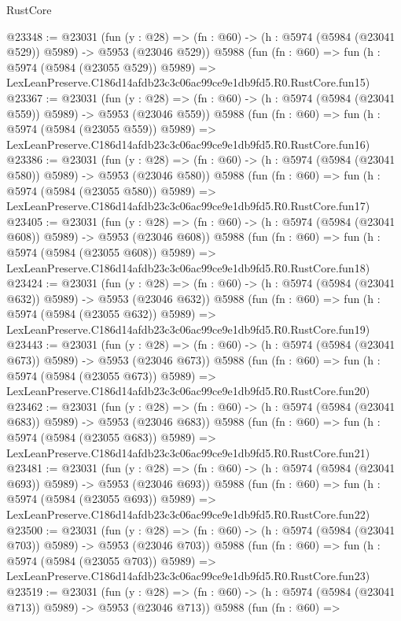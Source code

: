 \begin{lexlean}{RustCore}
\begin{coremodule}
@23348 := @23031
    (fun (y : @28) => (fn : @60) -> (h : @5974 (@5984 (@23041 @529)) @5989) -> @5953 (@23046 @529))
    @5988
    (fun (fn : @60) =>
    fun (h : @5974 (@5984 (@23055 @529)) @5989) =>
    LexLeanPreserve.C186d14afdb23c3c06ac99ce9e1db9fd5.R0.RustCore.fun15)
@23367 := @23031
    (fun (y : @28) => (fn : @60) -> (h : @5974 (@5984 (@23041 @559)) @5989) -> @5953 (@23046 @559))
    @5988
    (fun (fn : @60) =>
    fun (h : @5974 (@5984 (@23055 @559)) @5989) =>
    LexLeanPreserve.C186d14afdb23c3c06ac99ce9e1db9fd5.R0.RustCore.fun16)
@23386 := @23031
    (fun (y : @28) => (fn : @60) -> (h : @5974 (@5984 (@23041 @580)) @5989) -> @5953 (@23046 @580))
    @5988
    (fun (fn : @60) =>
    fun (h : @5974 (@5984 (@23055 @580)) @5989) =>
    LexLeanPreserve.C186d14afdb23c3c06ac99ce9e1db9fd5.R0.RustCore.fun17)
@23405 := @23031
    (fun (y : @28) => (fn : @60) -> (h : @5974 (@5984 (@23041 @608)) @5989) -> @5953 (@23046 @608))
    @5988
    (fun (fn : @60) =>
    fun (h : @5974 (@5984 (@23055 @608)) @5989) =>
    LexLeanPreserve.C186d14afdb23c3c06ac99ce9e1db9fd5.R0.RustCore.fun18)
@23424 := @23031
    (fun (y : @28) => (fn : @60) -> (h : @5974 (@5984 (@23041 @632)) @5989) -> @5953 (@23046 @632))
    @5988
    (fun (fn : @60) =>
    fun (h : @5974 (@5984 (@23055 @632)) @5989) =>
    LexLeanPreserve.C186d14afdb23c3c06ac99ce9e1db9fd5.R0.RustCore.fun19)
@23443 := @23031
    (fun (y : @28) => (fn : @60) -> (h : @5974 (@5984 (@23041 @673)) @5989) -> @5953 (@23046 @673))
    @5988
    (fun (fn : @60) =>
    fun (h : @5974 (@5984 (@23055 @673)) @5989) =>
    LexLeanPreserve.C186d14afdb23c3c06ac99ce9e1db9fd5.R0.RustCore.fun20)
@23462 := @23031
    (fun (y : @28) => (fn : @60) -> (h : @5974 (@5984 (@23041 @683)) @5989) -> @5953 (@23046 @683))
    @5988
    (fun (fn : @60) =>
    fun (h : @5974 (@5984 (@23055 @683)) @5989) =>
    LexLeanPreserve.C186d14afdb23c3c06ac99ce9e1db9fd5.R0.RustCore.fun21)
@23481 := @23031
    (fun (y : @28) => (fn : @60) -> (h : @5974 (@5984 (@23041 @693)) @5989) -> @5953 (@23046 @693))
    @5988
    (fun (fn : @60) =>
    fun (h : @5974 (@5984 (@23055 @693)) @5989) =>
    LexLeanPreserve.C186d14afdb23c3c06ac99ce9e1db9fd5.R0.RustCore.fun22)
@23500 := @23031
    (fun (y : @28) => (fn : @60) -> (h : @5974 (@5984 (@23041 @703)) @5989) -> @5953 (@23046 @703))
    @5988
    (fun (fn : @60) =>
    fun (h : @5974 (@5984 (@23055 @703)) @5989) =>
    LexLeanPreserve.C186d14afdb23c3c06ac99ce9e1db9fd5.R0.RustCore.fun23)
@23519 := @23031
    (fun (y : @28) => (fn : @60) -> (h : @5974 (@5984 (@23041 @713)) @5989) -> @5953 (@23046 @713))
    @5988
    (fun (fn : @60) =>

\end{coremodule}
\end{lexlean}
